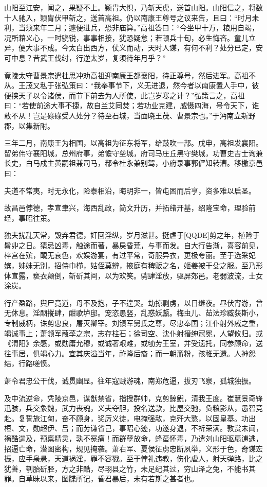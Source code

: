 \documentclass[12pt,UTF8]{ctexbook}
\begin{document}
山阳至江安，闻之，果疑不上。颖胄大惧，乃斩天虎，送首山阳。山阳信之，将数十人驰入，颖胄伏甲斩之，送首高祖。仍以南康王尊号之议来告，且曰：“时月未利，当须来年二月；遽便进兵，恐非庙算。”高祖答曰：“今坐甲十万，粮用自竭，况所藉义心，一时骁锐，事事相接，犹恐疑怠；若顿兵十旬，必生悔吝。童儿立异，便大事不成。今太白出西方，仗义而动，天时人谋，有何不利？处分已定，安可中息？昔武王伐纣，行逆太岁，复须待年月乎？”

竟陵太守曹景宗遣杜思冲劝高祖迎南康王都襄阳，待正尊号，然后进军。高祖不从。王茂又私于张弘策曰：“我奉事节下，义无进退，然今者以南康置人手中，彼便挟天子以令诸侯，而节下前去为人所使，此岂岁寒之计？”弘策言之，高祖曰：“若使前途大事不捷，故自兰艾同焚；若功业克建，威慑四海，号令天下，谁敢不从！岂是碌碌受人处分？待至石城，当面晓王茂、曹景宗也。”于沔南立新野郡，以集新附。

三年二月，南康王为相国，以高祖为征东将军，给鼓吹一部。戊申，高祖发襄阳。留弟伟守襄阳城，总州府事，弟憺守垒城，府司马庄丘黑守樊城，功曹史吉士询兼长史，白马戍主黄嗣祖兼司马，鄀令杜永兼别驾，小府录事郭俨知转漕。移檄京邑曰：

夫道不常夷，时无永化，险泰相沿，晦明非一，皆屯困而后亨，资多难以启圣。

故昌邑悖德，孝宣聿兴，海西乱政，简文升历，并拓绪开基，绍隆宝命，理验前经，事昭往策。

独夫扰乱天常，毁弃君德，奸回淫纵，岁月滋甚。挺虐于[QQDE]剪之年，植险于髫丱之日。猜忌凶毒，触途而著，暴戾昏荒，与事而发。自大行告渐，喜容前见，梓宫在殡，靦无哀色，欢娱游宴，有过平常，奇服异衣，更极夸丽。至于选采妃嫔，姊妹无别，招侍巾栉，姑侄莫辨，掖庭有稗贩之名，姬姜被干殳之服。至乃形体宣露，亵衣颠倒，斩斫其间，以为欢笑。骋肆淫放，驱屏郊邑。老弱波流，士女涂炭。

行产盈路，舆尸竟道，母不及抱，子不遑哭。劫掠剽虏，以日继夜。昼伏宵游，曾无休息。淫酗摐肆，酣歌垆邸。宠恣愚竖，乱惑妖甗。梅虫儿、茹法珍臧获斯小，专制威柄，诛剪忠良，屠灭卿宰。刘镇军舅氏之尊，尽忠奉国；江仆射外戚之重，竭诚事上；萧领军葭莩之宗，志存柱石；徐司空、沈仆射搢绅冠冕，人望攸归。或《渭阳》余感，或勋庸允穆，或诚著艰难，或劬劳王室，并受遗托，同参顾命，送往事居，俱竭心力。宜其庆溢当年，祚隆后裔；而一朝齑粉，孩稚无遗。人神怨结，行路嗟愤。

萧令君忠公干伐，诚贯幽显。往年寇贼游魂，南郑危逼，拔刃飞泉，孤城独振。

及中流逆命，凭陵京邑，谋猷禁省，指授群帅，克剪鲸鲵，清我王度。崔慧景奇锋迅骇，兵交象魏，武力丧魂，义夫夺胆，投名送款，比屋交驰，负粮影从，愚智竞赴。复誓旅江甸，奋不顾身，奖厉义徒，电掩强敌，克歼大憝，以固皇基。功出桓、文，勋超伊、吕；而劳谦省己，事昭心迹，功遂身退，不祈荣满。敦赏未闻，祸酷遄及，预禀精灵，孰不冤痛！而群孽放命，蜂虿怀毒，乃遣刘山阳驱扇逋逃，招逼亡命，潜图密构，规见掩袭。萧右军、夏侯征虏忠断夙举，义形于色，奇谋宏振，应手枭悬，天道祸淫，罪不容戮。至于悖礼违教，伤化虐人，射天弹路，比之犹善，刳胎斫胫，方之非酷，尽珝县之竹，未足纪其过，穷山泽之兔，不能书其罪。自草昧以来，图牒所记，昏君暴后，未有若斯之甚者也。
\end{document}

